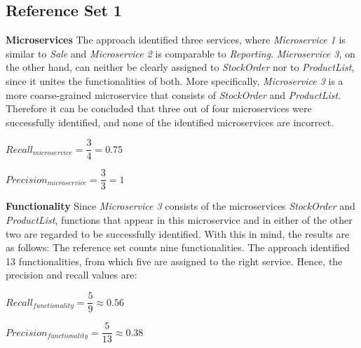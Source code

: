 \subsection{Reference Set 1}

\textbf{Microservices} The approach identified three services, where \textit{Microservice 1} is similar to \textit{Sale} and \textit{Microservice 2} is comparable to \textit{Reporting}. \textit{Microservice 3}, on the other hand, can neither be clearly assigned to \textit{StockOrder} nor to \textit{ProductList}, since it unites the functionalities of both. More specifically, \textit{Microservice 3} is a more coarse-grained microservice that consists of \textit{StockOrder} and \textit{ProductList}. Therefore it can be concluded that three out of four microservices were successfully identified, and none of the identified microservices are incorrect. 

\hspace{1cm}
\noindent
\begin{minipage}{.4\linewidth}
		\vspace{0.5cm}
	\flushleft

		
	$Recall_{microservice}=\dfrac{3}{4} = 0.75  $
		\vspace{0.5cm}
	
\end{minipage}%
\begin{minipage}{.5\linewidth}
	\vspace{0.5cm}
	\flushleft

		
	$Precision_{microservice}=\dfrac{3}{3} = 1  $
		\vspace{0.5cm}
	
\end{minipage}

\noindent
\textbf{Functionality} Since \textit{Microservice 3} consists of the microservices \textit{StockOrder} and \textit{ProductList}, functions that appear in this microservice and in either of the other two are regarded to be successfully identified. With this in mind, the results are as follows: The reference set counts nine functionalities. The approach identified 13 functionalities, from which five are assigned to the right service. Hence, the precision and recall values are:

\hspace{1cm}
\noindent
\begin{minipage}{.4\linewidth}
	\vspace{0.5cm}
	\flushleft
	
	
	$Recall_{functionality}=\dfrac{5}{9} \approx 0.56  $
	\vspace{0.5cm}
	
\end{minipage}%
\begin{minipage}{.5\linewidth}
	\vspace{0.5cm}
	\flushleft
	
	
	$Precision_{functionality}=\dfrac{5}{13} \approx 0.38  $
	\vspace{0.5cm}
	
\end{minipage}


